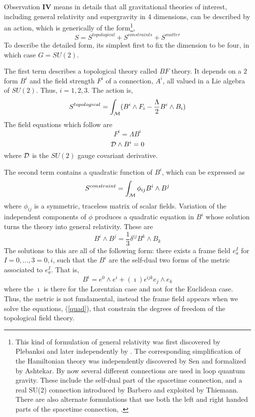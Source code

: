 \documentclass[12pt]{article}
\newcommand{\f}{\begin{equation}}
\newcommand{\ff}{\end{equation}}
\begin{document}
Observation {\bf IV} means in details that all gravitational theories of interest, 
including general relativity and supergravity in 4 dimensions, can be described  by an action, 
which is generically of the form\footnote{This kind of formulation of general
relativity was first discovered by Plebanksi\cite{plebanski} and
later independently by \cite{JSS,CDJ}. The corresponding simplification
of the Hamiltonian theory was independently 
discovered by Sen\cite{sen} and formalized by Ashtekar\cite{abhay}.  By now several
 different connections are used in loop quantum gravity. These include the
 self-dual part of the spacetime connection\cite{sen,abhay}, and a real
 SU(2) connection introduced by Barbero\cite{barbero} and exploited by
 Thiemann\cite{thomas}. There are also alternate formulations that
 use both the left and right handed parts of the spacetime connection,
 \cite{yime-holo,me-holo}.},
\f S=S^{topological} + S^{constraints} + S^{matter}
\label{master}
\ff
To describe the detailed form, its simplest first to fix the dimension to be four,
in which case $G=SU(2)$. 

The first term describes a topological theory called $BF$ theory.  It 
depends on a $2$ form $B^i$ and the field strength $F^i$ of  a connection, $A^i$,
all valued in a Lie algebra of  $SU(2)$.  Thus, $i=1,2,3$.   The action is, 
\f
S^{topological}=\int_{\cal M}   ( B^i \wedge F_i - \frac{\Lambda}{2}B^i \wedge B_i )
\label{topological}
\ff
The field equations which follow are
\f
F^i = \Lambda B^i
\label{Ftop}
\ff
\f
{\cal D} \wedge B^i =0 
\label{Btop}
\ff
where $\cal D$ is the $SU(2)$ gauge covariant derivative.

The second term contains  a quadratic function of $B^i$, which 
can be  expressed as
\f
S^{constraint} = \int_{\cal M} \phi_{ij} B^i \wedge B^j
\ff
where $\phi_{ij}$ is a symmetric, traceless matrix of scalar fields. 
Variation of the independent components of $\phi$ produces a quadratic equation in $B^i$ whose solution 
turns the theory into
general relativity.   These are
\f
B^i \wedge B^j = \frac{1}{3}\delta^{ij}B^k \wedge B_k
\label{quad}
\ff
The solutions to this are all of the following form:  there exists a frame field $e_a^I$ for 
$I=0,...,3=0,i$, such that
the $B^i$ are the self-dual two forms of the metric associated to $e_a^I$.  That is,
\f
B^i = e^0 \wedge e^i + (\imath) \epsilon^{ijk} e_j \wedge e_k
\ff
where the $\imath$ is there for the Lorentzian case and not for the Euclidean case. 
Thus, the metric is not fundamental, instead the frame field appears when we solve
the equations, (\ref{quad}),  that constrain the degrees of freedom of the topological field theory. 
\end{document}
